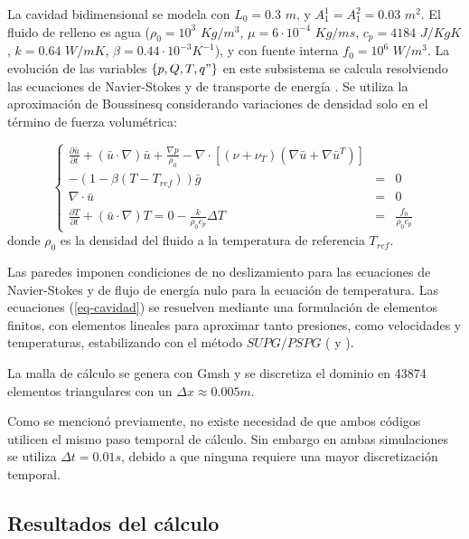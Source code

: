 La cavidad bidimensional se modela con $L_0=0.3$ $m$, y $A_1^1=A_1^2=0.03$ $m^2$.
El fluido de relleno es agua ($\rho_0=10^3$ $Kg/m^3$, $\mu=6\cdot 10^{-4}$ $Kg/ms$, $c_p=4184$ $J/KgK$, 
$k=0.64$ $W/mK$, $\beta=0.44\cdot10^{-3}K^{-1}$),
y con fuente interna $f_0=10^6$ $W/m^3$.
La evolución de las variables $\{p,Q,T,q"\}$ en este subsistema se calcula resolviendo las ecuaciones de Navier-Stokes {\cite{gunzburger}}
y de transporte de energía \cite{kays}. 
Se utiliza la aproximación de Boussinesq considerando variaciones de densidad solo en el término de fuerza volumétrica:

\begin{equation}
\left\{ \begin{array}{rcl}
\displaystyle \frac {\partial \bar{u}}{\partial t} + ( \bar{u} \cdot \nabla) \bar{u}  + \frac {\nabla p}{\rho_0} - 
\nabla \cdot \left[ \left( \nu + \nu_T \right) \left( \nabla \bar{u} + \nabla \bar{u}^T \right) \right] && \\
- \left( 1- \beta (T-T_{ref}) \right)\bar{g} &=& 0 \\ [0.2cm]
\nabla \cdot \bar{u} &=& 0 \\ [0.2cm]
\displaystyle \frac {\partial T}{\partial t} + ( \bar{u} \cdot \nabla) T =0 - \frac {k}{\rho_0 c_p} \Delta T &=& \displaystyle \frac{f_0}{\rho_0 c_p}
\label{eq-cavidad}
\end{array}
\right.
\end{equation}
donde $\rho_0$ es la densidad del fluido a la temperatura de referencia $T_{ref}$.

Las paredes imponen condiciones de no deslizamiento para las ecuaciones de Navier-Stokes y de flujo de energía nulo para la ecuación de temperatura.
Las ecuaciones (\ref{eq-cavidad}) se resuelven mediante una formulación de elementos finitos, 
con elementos lineales para aproximar tanto presiones, como velocidades y temperaturas, 
estabilizando con el método $SUPG/PSPG$ (\cite{supg} y \cite{pspg}).

La malla de cálculo se genera con Gmsh \cite{gmsh} y se discretiza el dominio en 43874 elementos triangulares con un $\Delta x \approx 0.005m$. 

Como se mencionó previamente, no existe necesidad de que ambos códigos utilicen el mismo paso temporal de cálculo.
Sin embargo en ambas simulaciones se utiliza $\Delta t=0.01s$, debido a que ninguna requiere una mayor discretización temporal.

\subsection*{Resultados del cálculo}

